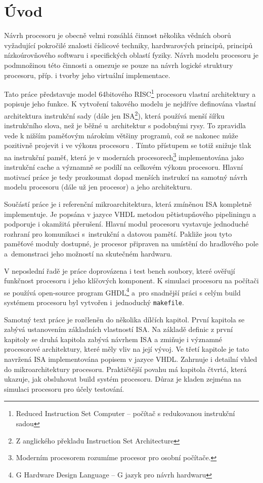 \documentclass[
  digital, %
  color,   %
  table,   %
  twoside, %
  nolof,   %
  nolot,   %
]{fithesis3}
\begin{document}
\chapter*{Úvod}
Návrh procesoru je obecně velmi rozsáhlá činnost několika vědních oborů vyžadující pokročilé znalosti číslicové techniky, hardwarových principů, principů nízkoúrovňového softwaru i specifických oblastí fyziky. Návrh modelu procesoru je podmnožinou této činnosti a omezuje se pouze na návrh logické struktury procesoru, příp. i tvorby jeho virtuální implementace.

Tato práce představuje model 64bitového RISC\footnote{Reduced Instruction Set Computer -- počítač s redukovanou instrukční sadou} procesoru vlastní architektury a popisuje jeho funkce. K vytvoření takového modelu je nejdříve definována vlastní architektura instrukční sady (dále jen ISA\footnote{Z anglického překladu Instruction Set Architecture}), která používá menší šířku instrukčního slova, než je běžné u~architektur s podobnými rysy. To zpravidla vede k nižším paměťovým nárokům většiny programů, což se nakonec může pozitivně projevit i ve výkonu procesoru \parencite{bunda93}. Tímto přístupem se totiž snižuje tlak na instrukční paměť, která je v moderních procesorech\footnote{Moderním procesorem rozumíme procesor pro osobní počítače.} implementována jako instrukční cache a významně se podílí na celkovém výkonu procesoru. Hlavní motivací práce je tedy prozkoumat dopad menších instrukcí na samotný návrh modelu procesoru (dále už jen procesor) a jeho architekturu.

Součástí práce je i referenční mikroarchitektura, která zmíněnou ISA kompletně implementuje. Je popsána v jazyce VHDL metodou pětistupňového pipeliningu a podporuje i okamžitá přerušení. Hlavní modul procesoru vystavuje jednoduché rozhraní pro komunikaci s~instrukční a datovou pamětí. Pakliže jsou tyto paměťové moduly dostupné, je procesor připraven na umístění do hradlového pole a~demonstraci jeho možností na skutečném hardwaru.

V neposlední řadě je práce doprovázena i test bench soubory, které ověřují funkčnost procesoru i jeho klíčových komponent. K simulaci procesoru na počítači se používá open-source program GHDL\footnote{G Hardware Design Language -- G jazyk pro návrh hardwaru} a~pro snadnější práci s celým build systémem procesoru byl vytvořen i~jednoduchý \texttt{makefile}.

Samotný text práce je rozčleněn do několika dílčích kapitol. První kapitola se zabývá ustanovením základních vlastností ISA. Na základě definic z první kapitoly se druhá kapitola zabývá návrhem ISA a zmiňuje i významné procesorové architektury, které měly vliv na její vývoj. Ve třetí kapitole je tato navržená ISA implementována popisem v jazyce VHDL. Zahrnuje i detailní vhled do mikroarchitektury procesoru. Praktičtější povahu má kapitola čtvrtá, která ukazuje, jak obsluhovat build systém procesoru. Důraz je kladen zejména na simulaci procesoru pro účely testování.
\end{document}
